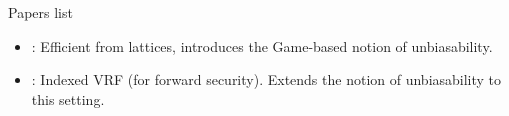 Papers list
\begin{itemize}
	\item \cite{EPRINT:EKSSZSC20}: Efficient from lattices, introduces the Game-based notion of unbiasability.
	
	\item \cite{EPRINT:EEKLSSYZ22}: Indexed VRF (for forward security). Extends the notion of unbiasability to this setting.	
\end{itemize}